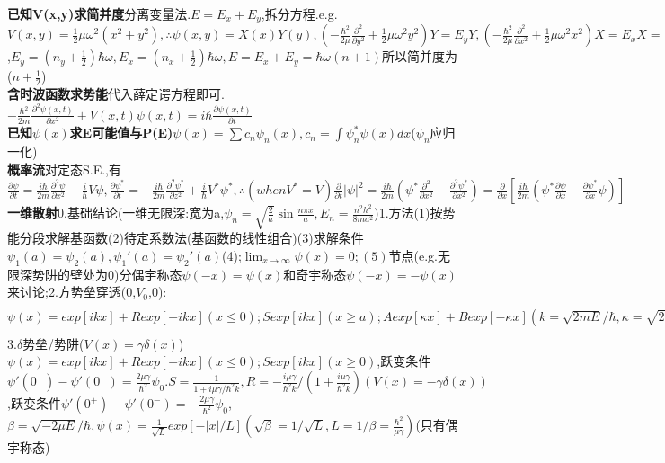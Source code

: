 \documentclass[UTF8,a4paper,7pt,twocolumn]{ctexart}
\begin{document}
      \textbf{已知V(x,y)求简并度}分离变量法.$E=E_{x}+E_{y}$,拆分方程.e.g.$V(x,y)=\frac{1}{2}\mu\omega^{2}(x^{2}+y^{2}),\therefore \psi(x,y)=X(x)Y(y),(-\frac{\hbar^{2}}{2\mu}\frac{\partial^{2}}{\partial y^{2}}+\frac{1}{2}\mu\omega^{2}y^{2})Y=E_{y}Y,(-\frac{\hbar^{2}}{2\mu}\frac{\partial^{2}}{\partial x^{2}}+\frac{1}{2}\mu\omega^{2}x^{2})X=E_{x}X=(E-E_{y})X$,$E_{y}=(n_{y}+\frac{1}{2})\hbar\omega,E_{x}=(n_{x}+\frac{1}{2})\hbar\omega,E=E_{x}+E_{y}=\hbar\omega(n+1)$所以简并度为($n+\frac{1}{2}$)\\
      \textbf{含时波函数求势能}代入薛定谔方程即可.$-\frac{\hbar^2}{2m}\frac{\partial^{2}\psi(x,t)}{\partial x^{2}}+V(x,t)\psi(x,t)=i\hbar\frac{\partial\psi(x,t)}{\partial t}$\\
      \textbf{已知$\psi(x)$求E可能值与P(E)}$\psi(x)=\sum c_{n}\psi_{n}(x),c_{n}=\int\psi_{n}^{*}\psi(x)dx$($\psi_{n}$应归一化)\\
      \textbf{概率流}对定态S.E.,有$\frac{\partial\psi}{\partial t}=\frac{i\hbar}{2m}\frac{\partial^{2}\psi}{\partial x^{2}}-\frac{i}{\hbar}V\psi,\frac{\partial\psi^{*}}{\partial t}=-\frac{i\hbar}{2m}\frac{\partial^{2}\psi^{*}}{\partial z^{2}}+\frac{i}{\hbar}V^{*}\psi^{*},\therefore(whenV^{*}=V)\frac{\partial}{\partial t}|\psi|^{2}=\frac{i\hbar}{2m}(\psi^{*}\frac{\partial^{2}}{\partial x^{2}}-\frac{\partial^{2}\psi^{*}}{\partial x^{2}})=\frac{\partial}{\partial x}[\frac{i\hbar}{2m}(\psi^{*}\frac{\partial\psi}{\partial x}-\frac{\partial\psi^{*}}{\partial x}\psi)]$\\
      \textbf{一维散射}0.基础结论(一维无限深:宽为a,$\psi_{n}=\sqrt{\frac{2}{a}}\sin{\frac{n\pi x}{a}},E_{n}=\frac{n^2h^2}{8ma^2}$)1.方法(1)按势能分段求解基函数(2)待定系数法(基函数的线性组合)(3)求解条件$\psi_{1}(a)=\psi_{2}(a),\psi_{1}'(a)=\psi_{2}'(a)$(4);$\lim_{x\longrightarrow\infty}\psi(x)=0;(5)$节点(e.g.无限深势阱的壁处为0)分偶宇称态$\psi(-x)=\psi(x)$和奇宇称态$\psi(-x)=-\psi(x)$来讨论;2.方势垒穿透(0,$V_{0}$,0):$\psi(x)=exp[ikx]+Rexp[-ikx](x\leq0);Sexp[ikx](x\geq a);Aexp[\kappa x]+Bexp[-\kappa x](k=\sqrt{2mE}/\hbar,\kappa=\sqrt{2m(V_{0}-E)}/\hbar).|S|^{2}=\frac{4k^{2}\kappa^{2}}{(k^{2}+\kappa^{2}\sinh^{2}\kappa a+4k^{2}\kappa^{2})}=[1+\frac{1}{E/V_{0}(1-E/V_{0})}\sinh^{2}\kappa a]^{-1},|R|^{2}=\frac{(k^{2}+\kappa^{2})\sinh^{2}\kappa a}{(k^{2}+\kappa^{2})^{2}\sinh^{2}\kappa a+4k^{2}\kappa^{2}}$3.$\delta$势垒/势阱($V(x)=\gamma\delta(x)$)$\psi(x)=exp[ikx]+Rexp[-ikx](x\leq 0);Sexp[ikx](x\geq 0)$,跃变条件$\psi'(0^{+})-\psi'(0^{-})=\frac{2\mu\gamma}{\hbar^{2}}\psi_{0}.S=\frac{1}{1+i\mu\gamma/\hbar^{2}k},R=-\frac{i\mu\gamma}{\hbar^{2}k}/(1+\frac{i\mu\gamma}{\hbar^{2}k})(V(x)=-\gamma\delta(x))$,跃变条件$\psi'(0^{+})-\psi'(0^{-})=-\frac{2\mu\gamma}{\hbar^{2}}\psi_{0}$,$\beta=\sqrt{-2\mu E}/\hbar,\psi(x)=\frac{1}{\sqrt{L}}exp[-|x|/L](\sqrt{\beta}=1/\sqrt{L},L=1/\beta=\frac{\hbar^{2}}{\mu\gamma})$(只有偶宇称态)\\
\end{document}
